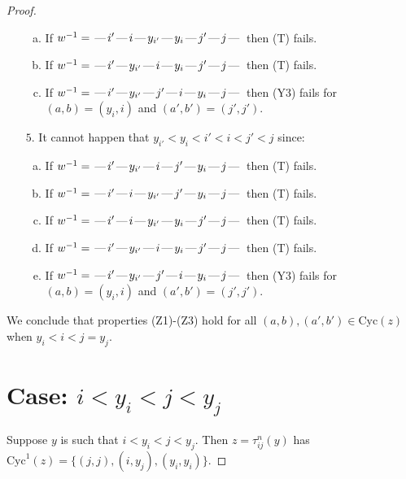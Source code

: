 \documentclass[10pt]{article}
\theoremstyle{definition}
\theoremstyle{definition}
\def\dash{\text{\hspace{0.5mm}---\hspace{0.5mm}}}
\def\Cyc{\mathrm{Cyc}}
\begin{document}
\begin{proof}
\begin{enumerate}
\begin{enumerate}[(a)]
\item If $w^{-1} = \dash i'\dash i\dash y_{i'}\dash y_i\dash j'\dash j\dash $ then (T) fails.
\item If $w^{-1} = \dash i'\dash y_{i'}\dash i\dash y_i\dash j'\dash j\dash $ then (T) fails.
\item If $w^{-1} = \dash i'\dash y_{i'}\dash j'\dash i\dash y_i\dash j\dash $ then (Y3) fails for $(a,b)=(y_i,i)$ and $(a',b')=(j',j')$.
\end{enumerate}
\item[$5$.] It cannot happen that $y_{i'} < y_i < i' < i < j' < j$ since:
\begin{enumerate}[(a)]
\item If $w^{-1} = \dash i'\dash y_{i'}\dash i\dash j'\dash y_i\dash j\dash $ then (T) fails.
\item If $w^{-1} = \dash i'\dash i\dash y_{i'}\dash j'\dash y_i\dash j\dash $ then (T) fails.
\item If $w^{-1} = \dash i'\dash i\dash y_{i'}\dash y_i\dash j'\dash j\dash $ then (T) fails.
\item If $w^{-1} = \dash i'\dash y_{i'}\dash i\dash y_i\dash j'\dash j\dash $ then (T) fails.
\item If $w^{-1} = \dash i'\dash y_{i'}\dash j'\dash i\dash y_i\dash j\dash $ then (Y3) fails for $(a,b)=(y_i,i)$ and $(a',b')=(j',j')$.
\end{enumerate}
\end{enumerate}
We conclude that properties (Z1)-(Z3) hold for all 
$(a,b),(a',b') \in \Cyc(z)$ when $y_i < i < j = y_j$.
\section{Case: $i < y_i < j < y_j$}
Suppose $y$ is such that $i < y_i < j < y_j$.
Then $z = \tau^n_{ij}(y)$ has $\Cyc^1(z) = \{(j,j),(i,y_j),(y_i,y_i)\}.$

\end{proof}
\end{document}
